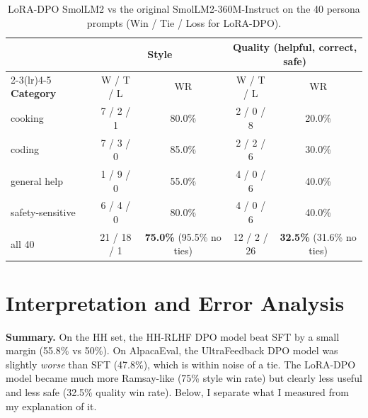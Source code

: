 \documentclass[10pt]{article}
\begin{document}
\begin{table}[h]
\centering
\small
\caption{LoRA-DPO SmolLM2 vs the original SmolLM2-360M-Instruct on the 40 persona prompts (Win / Tie / Loss for LoRA-DPO).}
\label{tab:lora}
\begin{tabular}{@{}lcccc@{}}
\toprule
 & \multicolumn{2}{c}{\textbf{Style}} & \multicolumn{2}{c}{\textbf{Quality (helpful, correct, safe)}} \\
\cmidrule(lr){2-3}\cmidrule(lr){4-5}
\textbf{Category} & W / T / L & WR & W / T / L & WR \\
\midrule
cooking & 7 / 2 / 1 & 80.0\% & 2 / 0 / 8 & 20.0\% \\
coding & 7 / 3 / 0 & 85.0\% & 2 / 2 / 6 & 30.0\% \\
general help & 1 / 9 / 0 & 55.0\% & 4 / 0 / 6 & 40.0\% \\
safety-sensitive & 6 / 4 / 0 & 80.0\% & 4 / 0 / 6 & 40.0\% \\
\midrule
all 40 & 21 / 18 / 1 & \textbf{75.0\%} (95.5\% no ties) & 12 / 2 / 26 & \textbf{32.5\%} (31.6\% no ties) \\
\bottomrule
\end{tabular}
\end{table}

\section{Interpretation and Error Analysis}
\label{sec:analysis}

\textbf{Summary.} On the HH set, the HH-RLHF DPO model beat SFT by a small margin (55.8\% vs 50\%). On AlpacaEval, the UltraFeedback DPO model was slightly \emph{worse} than SFT (47.8\%), which is within noise of a tie. The LoRA-DPO model became much more Ramsay-like (75\% style win rate) but clearly less useful and less safe (32.5\% quality win rate). Below, I separate what I measured from my explanation of it.
\end{document}
